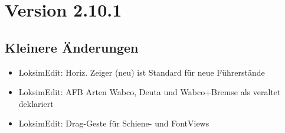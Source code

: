 \section{Version 2.10.1}

\subsection{Kleinere Änderungen}
\begin{itemize}
    \item LoksimEdit: Horiz. Zeiger (neu) ist Standard für neue Führerstände
    \item LoksimEdit: AFB Arten Wabco, Deuta und Wabco+Bremse als veraltet deklariert
    \item LoksimEdit: Drag-Geste für Schiene- und FontViews
\end{itemize}

